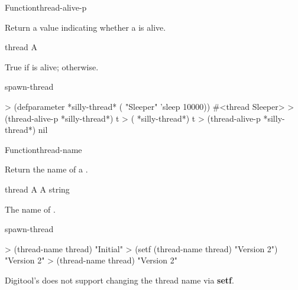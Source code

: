 \begin{functiondoc}{Function}{thread-alive-p}{ 
    \returns{} }

\fnsyntax

\fnpurpose Return a value indicating whether a  is alive.

\fnpackage {}

\fnmodule {}

\fnargs
\begin{args}{thread}
\arg[thread] A 
\end{args}

\fnreturns True if  is alive; \nil{} otherwise.

\fnerrors
\nothreads{}

\begin{alsos}{spawn-thread}
\end{alsos}

%
%
\fnexamples
\begin{example}
> (defparameter *silly-thread* ( "Sleeper" 'sleep 10000))
#<thread Sleeper>
> (thread-alive-p *silly-thread*)
t
> ( *silly-thread*)
t
> (thread-alive-p *silly-thread*)
nil
\end{example}

\end{functiondoc}


\begin{functiondoc}{Function}{thread-name}{ 
   \returns{} } 

\fnsyntax

\fnpurpose Return the name of a .

\fnsetf
{}

\fnpackage {}

\fnmodule {}

\fnargs
\begin{args}{thread}
\arg[thread] A 
 A string
\end{args}

\fnreturns The name of .

\fnerrors
\nothreads{}

\begin{alsos}{spawn-thread}
\end{alsos}

\fnexamples
\begin{example}
> (thread-name thread)
"Initial"
> (setf (thread-name thread) "Version 2")
"Version 2"
> (thread-name thread)
"Version 2"
\end{example}

\fnnote Digitool's 
does not support changing the thread name via \textbf{setf}.

\end{functiondoc}


